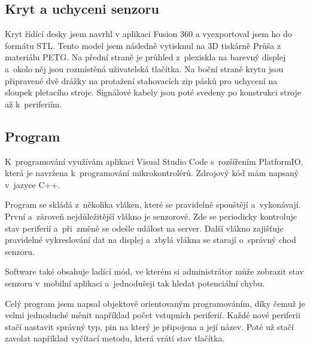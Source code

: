 \subsection{Kryt a uchyceni senzoru}
Kryt řídící desky jsem navrhl v aplikaci Fusion 360 a vyexportoval jsem ho do formátu STL.
Tento model jsem následně vytisknul na 3D tiskárně Průša z materiálu PETG.
Na přední straně je průhled z~plexiskla na barevný displej a~okolo něj jsou rozmístěná uživatelská tlačítka.
Na boční straně krytu jsou připravené dvě drážky na protažení stahovacích zip pásků pro uchycení na sloupek pletacího stroje.
Signálové kabely jsou poté svedeny po konstrukci stroje až k~periferiím.


\subsection{Program}
K~programování využívám aplikaci Visual Studio Code s~rozšířením PlatformIO, která je navržena k~programování mikrokontrolérů. 
Zdrojový kód mám napsaný v~jazyce C++.

Program se skládá z~několika vláken, které se pravidelně spouštějí a~vykonávají.
První a~zároveň nejdůležitější vlákno je senzorové.
Zde se periodicky kontroluje stav periferií a~při~změně se odešle událost na server.
Další vlákno zajišťuje pravidelné vykreslování dat na displej a~zbylá vlákna se starají o~správný chod senzoru.

Software také obsahuje ladící mód, ve kterém si administrátor může zobrazit stav senzoru v~mobilní aplikaci a~jednodušeji tak hledat potenciální chybu.

Celý program jsem napsal objektově orientovaným programováním, díky čemuž je velmi jednoduché měnit například počet vstupních periferií.
Každé nové periferii stačí nastavit správný typ, pin na který je připojena a její název.
Poté už stačí zavolat například vyčítací metodu, která vrátí stav tlačítka.
\newline
\newline

